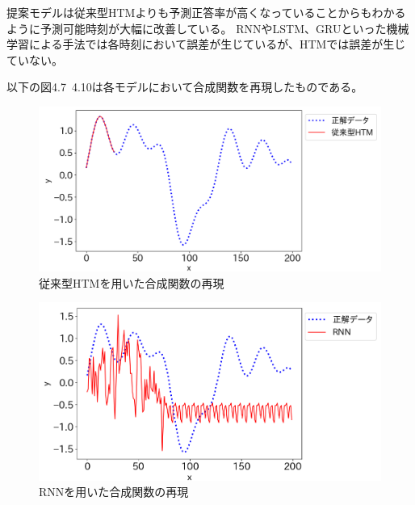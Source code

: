 提案モデルは従来型HTMよりも予測正答率が高くなっていることからもわかるように予測可能時刻が大幅に改善している。
RNNやLSTM、GRUといった機械学習による手法では各時刻において誤差が生じているが、HTMでは誤差が生じていない。

以下の図4.7~4.10は各モデルにおいて合成関数を再現したものである。

\begin{figure}[htp]
  \begin{center}
    \includegraphics[width=14cm]{./fig/htm}
    \caption{従来型HTMを用いた合成関数の再現}
    \label{fig:htm_experiment2}
  \end{center}
\end{figure}

\begin{figure}[hp]
  \begin{center}
    \includegraphics[width=14cm]{./fig/rnn}
    \caption{RNNを用いた合成関数の再現}
    \label{fig:rnn_experiment2}
  \end{center}
\end{figure}

